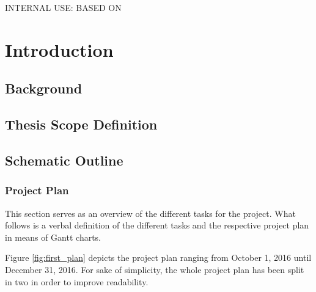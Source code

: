 \documentclass{seal_thesis}
\begin{document}
\begin{zusammenfassung}

\end{zusammenfassung}

\tableofcontents
\listoffigures
\listoftables
\lstlistoflistings

\pagebreak

\mainmatter

INTERNAL USE: BASED ON \cite{Search&Write2013}

\chapter{Introduction}
\section{Background}
\section{Thesis Scope Definition}
\section{Schematic Outline}
\subsection{Project Plan}
\label{subsec:project_plan}

This section serves as an overview of the different tasks for the project. What follows is a verbal definition of the different tasks and the respective project plan in means of Gantt charts.

Figure \ref{fig:first_plan} depicts the project plan ranging from October 1, 2016 until December 31, 2016. For sake of simplicity, the whole project plan has been split in two in order to improve readability.
\end{document}
